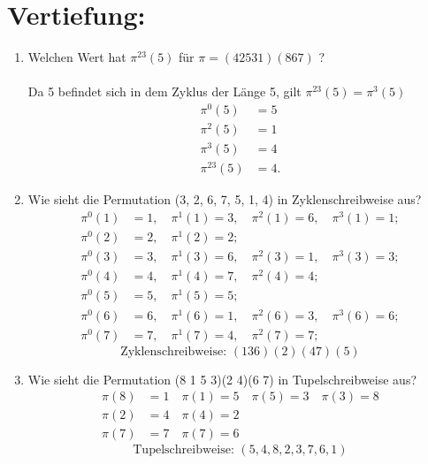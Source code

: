 



    \maketitle
    \section*{Vertiefung:}
    \begin{enumerate}[label=(\alph*)]
        \item Welchen Wert hat $\pi^{23}(5)$ f\"ur $\pi=(4 2 5 3 1)(8 6 7)$ ?\\\\
        Da 5 befindet sich in dem Zyklus der Länge 5, gilt $\pi^{23}(5)=\pi^{3}(5)$
        \begin{align*}
	        \pi^{0}(5) &= 5\\
	        \pi^2(5) &= 1\\
	        \pi^3(5) &= 4\\
	        \pi^{23}(5)&=4.
        \end{align*}
        
        \item Wie sieht die Permutation (3, 2, 6, 7, 5, 1, 4) in Zyklenschreibweise aus?
        \begin{align*}
            \pi^0(1) &= 1, \quad \pi^1(1) = 3, \quad \pi^2(1)=6, \quad \pi^3(1)=1; \\
            \pi^0(2) &= 2, \quad \pi^1(2) = 2; \\
            \pi^0(3) &= 3, \quad \pi^1(3) = 6, \quad \pi^2(3)=1, \quad \pi^3(3)=3; \\
            \pi^0(4) &= 4, \quad \pi^1(4) = 7, \quad \pi^2(4)=4; \\
            \pi^0(5) &= 5, \quad \pi^1(5) = 5; \\
            \pi^0(6) &= 6, \quad \pi^1(6) = 1, \quad \pi^2(6)=3, \quad \pi^3(6)=6; \\
            \pi^0(7) &= 7, \quad \pi^1(7) = 4, \quad \pi^2(7)=7;
        \end{align*}
       	\[\textrm{Zyklenschreibweise: } (136)(2)(47)(5)\]
        
        \item Wie sieht die Permutation (8 1 5 3)(2 4)(6 7) in Tupelschreibweise aus?
        \begin{align*}
        	\pi(8) &=1 \quad \pi(1)= 5 \quad \pi(5)=3 \quad \pi(3)=8\\
        	\pi(2) &=4 \quad \pi(4)=2\\
        	\pi(7) &=7 \quad \pi(7)=6
        \end{align*}
        \[\textrm{Tupelschreibweise: } (5,4,8,2,3,7,6,1)\]
        

\end{enumerate}
